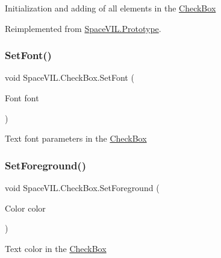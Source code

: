 Initialization and adding of all elements in the \mbox{\hyperlink{class_space_v_i_l_1_1_check_box}{Check\+Box}} 



Reimplemented from \mbox{\hyperlink{class_space_v_i_l_1_1_prototype_ac3379fe02923ee155b5b0084abf27420}{Space\+V\+I\+L.\+Prototype}}.

\mbox{\label{class_space_v_i_l_1_1_check_box_aa2c476ef3b72afc85fa42a685df7535e}} 
\subsubsection{\texorpdfstring{Set\+Font()}{SetFont()}}
{\footnotesize\ttfamily void Space\+V\+I\+L.\+Check\+Box.\+Set\+Font (\begin{DoxyParamCaption}\item[{Font}]{font }\end{DoxyParamCaption})}



Text font parameters in the \mbox{\hyperlink{class_space_v_i_l_1_1_check_box}{Check\+Box}} 

\mbox{\label{class_space_v_i_l_1_1_check_box_a67374114323c8079e8c8cf70738556f9}} 
\subsubsection{\texorpdfstring{Set\+Foreground()}{SetForeground()}}
{\footnotesize\ttfamily void Space\+V\+I\+L.\+Check\+Box.\+Set\+Foreground (\begin{DoxyParamCaption}\item[{Color}]{color }\end{DoxyParamCaption})}



Text color in the \mbox{\hyperlink{class_space_v_i_l_1_1_check_box}{Check\+Box}} 

\mbox{\label{class_space_v_i_l_1_1_check_box_a25dadac18b060b665065ddc3cb6b91bd}} 
